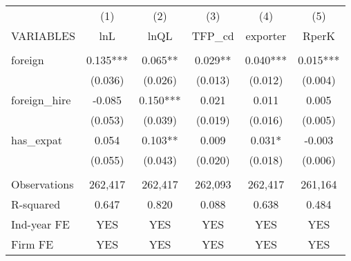 \begin{tabular}{lccccc} \hline
 & (1) & (2) & (3) & (4) & (5) \\
VARIABLES & lnL & lnQL & TFP\_cd & exporter & RperK \\ \hline
 &  &  &  &  &  \\
foreign & 0.135*** & 0.065** & 0.029** & 0.040*** & 0.015*** \\
 & (0.036) & (0.026) & (0.013) & (0.012) & (0.004) \\
foreign\_hire & -0.085 & 0.150*** & 0.021 & 0.011 & 0.005 \\
 & (0.053) & (0.039) & (0.019) & (0.016) & (0.005) \\
has\_expat & 0.054 & 0.103** & 0.009 & 0.031* & -0.003 \\
 & (0.055) & (0.043) & (0.020) & (0.018) & (0.006) \\
 &  &  &  &  &  \\
Observations & 262,417 & 262,417 & 262,093 & 262,417 & 261,164 \\
R-squared & 0.647 & 0.820 & 0.088 & 0.638 & 0.484 \\
Ind-year FE & YES & YES & YES & YES & YES \\
 Firm FE & YES & YES & YES & YES & YES \\ \hline
\end{tabular}

